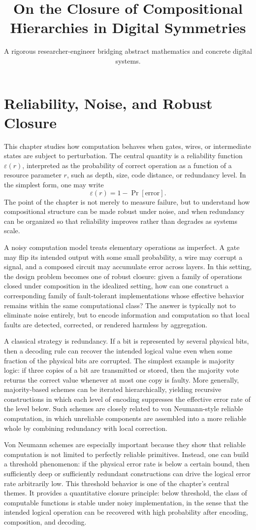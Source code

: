 \documentclass[11pt]{article}
\title{On the Closure of Compositional Hierarchies in Digital Symmetries}
\author{A rigorous researcher-engineer bridging abstract mathematics and concrete digital systems.}
\begin{document}
\section*{Reliability, Noise, and Robust Closure}

This chapter studies how computation behaves when gates, wires, or intermediate states are subject to perturbation. The central quantity is a reliability function \(\varepsilon(r)\), interpreted as the probability of correct operation as a function of a resource parameter \(r\), such as depth, size, code distance, or redundancy level. In the simplest form, one may write
\[
\varepsilon(r) = 1 - \Pr[\text{error}].
\]
The point of the chapter is not merely to measure failure, but to understand how compositional structure can be made robust under noise, and when redundancy can be organized so that reliability improves rather than degrades as systems scale.

A noisy computation model treats elementary operations as imperfect. A gate may flip its intended output with some small probability, a wire may corrupt a signal, and a composed circuit may accumulate error across layers. In this setting, the design problem becomes one of robust closure: given a family of operations closed under composition in the idealized setting, how can one construct a corresponding family of fault-tolerant implementations whose effective behavior remains within the same computational class? The answer is typically not to eliminate noise entirely, but to encode information and computation so that local faults are detected, corrected, or rendered harmless by aggregation.

A classical strategy is redundancy. If a bit is represented by several physical bits, then a decoding rule can recover the intended logical value even when some fraction of the physical bits are corrupted. The simplest example is majority logic: if three copies of a bit are transmitted or stored, then the majority vote returns the correct value whenever at most one copy is faulty. More generally, majority-based schemes can be iterated hierarchically, yielding recursive constructions in which each level of encoding suppresses the effective error rate of the level below. Such schemes are closely related to von Neumann-style reliable computation, in which unreliable components are assembled into a more reliable whole by combining redundancy with local correction.

Von Neumann schemes are especially important because they show that reliable computation is not limited to perfectly reliable primitives. Instead, one can build a threshold phenomenon: if the physical error rate is below a certain bound, then sufficiently deep or sufficiently redundant constructions can drive the logical error rate arbitrarily low. This threshold behavior is one of the chapter's central themes. It provides a quantitative closure principle: below threshold, the class of computable functions is stable under noisy implementation, in the sense that the intended logical operation can be recovered with high probability after encoding, composition, and decoding.
\end{document}
